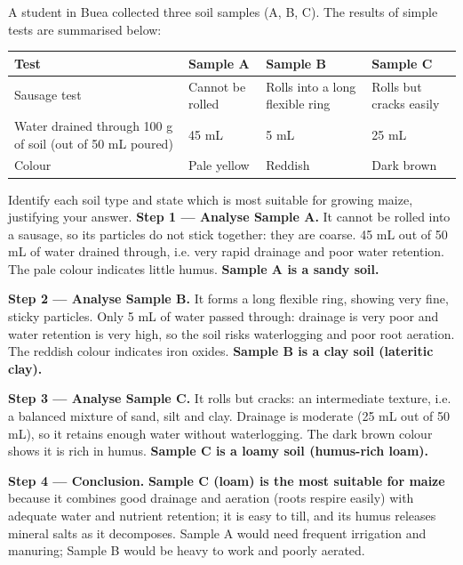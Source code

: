 \documentclass[11pt]{article}
\begin{document}
\begin{exoresolu}
A student in Buea collected three soil samples (A, B, C). The results of simple tests are summarised below:

\begin{center}
\begin{tabularx}{\linewidth}{|l|X|X|X|}
\hline
\rowcolor{popblueL} \textbf{Test} & \textbf{Sample A} & \textbf{Sample B} & \textbf{Sample C} \\
\hline
Sausage test & Cannot be rolled & Rolls into a long flexible ring & Rolls but cracks easily \\
\hline
Water drained through 100 g of soil (out of 50 mL poured) & 45 mL & 5 mL & 25 mL \\
\hline
Colour & Pale yellow & Reddish & Dark brown \\
\hline
\end{tabularx}
\end{center}

Identify each soil type and state which is most suitable for growing maize, justifying your answer.
\tcblower
\textbf{Step 1 — Analyse Sample A.} It cannot be rolled into a sausage, so its particles do not stick together: they are coarse. 45 mL out of 50 mL of water drained through, i.e. very rapid drainage and poor water retention. The pale colour indicates little humus. \textbf{Sample A is a sandy soil.}

\textbf{Step 2 — Analyse Sample B.} It forms a long flexible ring, showing very fine, sticky particles. Only 5 mL of water passed through: drainage is very poor and water retention is very high, so the soil risks waterlogging and poor root aeration. The reddish colour indicates iron oxides. \textbf{Sample B is a clay soil (lateritic clay).}

\textbf{Step 3 — Analyse Sample C.} It rolls but cracks: an intermediate texture, i.e. a balanced mixture of sand, silt and clay. Drainage is moderate (25 mL out of 50 mL), so it retains enough water without waterlogging. The dark brown colour shows it is rich in humus. \textbf{Sample C is a loamy soil (humus-rich loam).}

\textbf{Step 4 — Conclusion.} \textbf{Sample C (loam) is the most suitable for maize} because it combines good drainage and aeration (roots respire easily) with adequate water and nutrient retention; it is easy to till, and its humus releases mineral salts as it decomposes. Sample A would need frequent irrigation and manuring; Sample B would be heavy to work and poorly aerated.
\end{exoresolu}
\end{document}
